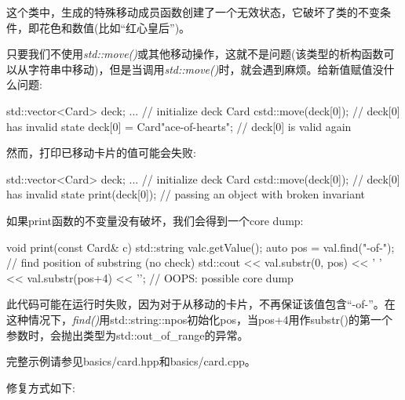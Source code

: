 这个类中，生成的特殊移动成员函数创建了一个无效状态，它破坏了类的不变条件，即花色和数值(比如“红心皇后”)。

只要我们不使用\textit{std::move()}或其他移动操作，这就不是问题(该类型的析构函数可以从字符串中移动)，但是当调用\textit{std::move()}时，就会遇到麻烦。给新值赋值没什么问题:

\begin{cppcode}
std::vector<Card> deck;
... // initialize deck
Card c{std::move(deck[0])}; // deck[0] has invalid state
deck[0] = Card{"ace-of-hearts"}; // deck[0] is valid again
\end{cppcode}

然而，打印已移动卡片的值可能会失败:

\begin{cppcode}
std::vector<Card> deck;
... // initialize deck
Card c{std::move(deck[0])}; // deck[0] has invalid state
print(deck[0]); // passing an object with broken invariant
\end{cppcode}

如果print函数的不变量没有破坏，我们会得到一个core dump:

\begin{cppcode}
void print(const Card& c) {
	std::string val{c.getValue()};
	auto pos = val.find("-of-"); // find position of substring (no check)
	std::cout << val.substr(0, pos) << ' '
	<< val.substr(pos+4) << '\n'; // OOPS: possible core dump
}
\end{cppcode}

此代码可能在运行时失败，因为对于从移动的卡片，不再保证该值包含“-of-”。在这种情况下，\textit{find()}用std::string::npos初始化pos，当pos+4用作substr()的第一个参数时，会抛出类型为std::out_of_range的异常。

完整示例请参见basics/card.hpp和basics/card.cpp。

修复方式如下:

